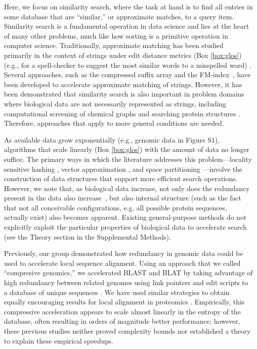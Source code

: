 \documentclass[review,preprint,12pt]{elsarticle}
\renewcommand{\cite}{\citep} %
\theoremstyle{definition}
\theoremstyle{remark}
\numberwithin{equation}{section}
\begin{document}
Here, we focus on similarity search, where the task at hand is to find all entries in some database that are ``similar,'' or approximate matches, to a query item.
Similarity search is a fundamental operation in data science and lies at the heart of many other problems, much like how sorting is a primitive operation in computer science.
Traditionally, approximate matching has been studied primarily in the context of strings under edit distance metrics (Box \ref{box:glos}) (e.g., for a spell-checker to suggest the most similar words to a misspelled word) \cite{ukkonen1985algorithms}.
Several approaches, such as the compressed suffix array and the FM-index~\cite{grossi2005compressed, ferragina2000opportunistic}, have been developed to accelerate approximate matching of strings.
However, it has been demonstrated that similarity search is also important in problem domains where biological data are not necessarily represented as strings, including computational screening of chemical graphs \cite{schaeffer2007graph} and searching protein structures \cite{budowski2010fragbag}.
Therefore, approaches that apply to more general conditions are needed.

As available data grow exponentially \cite{berger2013computational,yu2015quality} (e.g., genomic data in Figure S1), 
algorithms that scale linearly (Box \ref{box:glos}) with the amount of data no longer suffice.
The primary ways in which the literature addresses this problem---locality sensitive 
hashing \cite{indyk1998approximate}, vector approximation 
\cite{ferhatosmanoglu2000vector}, and space partitioning 
\cite{weber1998quantitative}---involve the construction of data structures that support more efficient search operations.
However, we note that, as biological data increase, not only does the redundancy present in the data also increase~\cite{loh2012compressive}, but also
internal structure (such as the fact that not all conceivable configurations, e.g. all possible protein sequences, actually exist) also becomes apparent.
Existing general-purpose methods do not explicitly exploit the particular 
properties of biological data to accelerate search (see the Theory section in the Supplemental Methods).

Previously, our group demonstrated how redundancy in genomic data could be used to accelerate local sequence alignment.
Using an approach that we called ``compresive genomics,'' we accelerated BLAST and BLAT \cite{kent2002blat} by taking advantage of high redundancy between related genomes using link pointers and edit scripts to a database of unique sequences \cite{loh2012compressive}.
We have used similar strategies to obtain equally encouraging results for local alignment in proteomics \cite{daniels2013compressive}.
Empirically, this compressive acceleration appears to scale almost linearly in the entropy of the database, often resulting in orders of magnitude better performance;
however, these previous studies neither proved complexity bounds nor established a theory to explain these empirical speedups.
\end{document}
